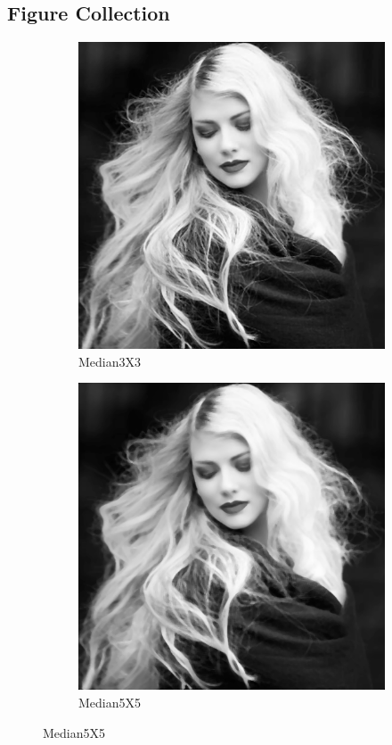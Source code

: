 \documentclass[14pt]{article}
\begin{document}
	\subsection{Figure Collection }
	\begin{figure}[hbt!]
		\centering
	\begin{subfigure}[b]{0.4\linewidth}
		\includegraphics[width=\linewidth]{m3.png}
		\caption{Median3X3}
	\end{subfigure}
	\begin{subfigure}[b]{0.4\linewidth}
		\includegraphics[width=\linewidth]{m5.png}
		\caption{Median5X5}
	\end{subfigure}
	\end{figure}
\end{document}
